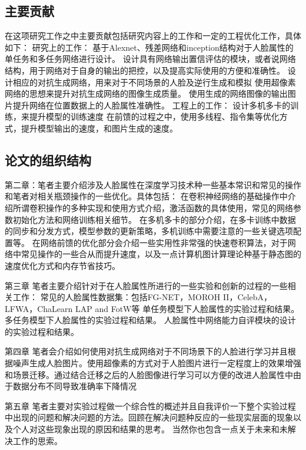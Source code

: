 \subsection{主要贡献}
在这项研究工作之中主要贡献包括研究内容上的工作和一定的工程优化工作，具体如下：
研究上的工作：
基于Alexnet、残差网络和inception结构对于人脸属性的单任务和多任务网络进行设计。
设计具有网络输出置信评估的模块，或者说网络结构，用于网络对于自身的输出的把控，以及提高实际使用的方便和准确性。
设计相应的对抗生成网络，用来对于不同场景的人脸及逆行生成和模拟
使用超像素网络的思想来提升对抗生成网络的图像生成质量。
使用生成的网络图像的输出图片提升网络在位置数据上的人脸属性准确性。
工程上的工作：
设计多机多卡的训练，来提升模型的训练速度
在前馈的过程之中，使用多线程、指令集等优化方式，提升模型输出的速度，和图片生成的速度。

\subsection{论文的组织结构}
第二章：笔者主要介绍涉及人脸属性在深度学习技术种一些基本常识和常见的操作和笔者对相关瓶颈操作的一些优化。具体包括：
在卷积神经网络的基础操作中介绍所谓卷积操作的多种实现和使用方式介绍，激活函数的具体使用，常见的网络参数初始化方法和网络训练相关细节。
在多机多卡的部分介绍，在多卡训练中数据的同步和分发方式，模型参数的更新策略，多机训练中需要注意的一些关键选项配置等。
在网络前馈的优化部分会介绍一些实用性非常强的快速卷积算法，对于网络中常见操作的一些合从而提升速度，以及一点计算机图计算理论种基于静态图的速度优化方式和内存节省技巧。

第三章
笔者主要介绍针对于在人脸属性所进行的一些实验和创新的过程的一些相关工作：
常见的人脸属性数据集：包括FG-NET，MOROH II，CelebA，LFWA，ChaLearn LAP and FotW等
单任务模型下人脸属性的实验过程和结果。
多任务模型下人脸属性的实验过程和结果。
人脸属性中网络能力自评模块的设计的实验过程和结果。

第四章
笔者会介绍如何使用对抗生成网络对于不同场景下的人脸进行学习并且根据噪声生成人脸图片。使用超像素的方式对于人脸图片进行一定程度上的效果增强和场景迁移。通过结合迁移之后的人脸图像进行学习可以方便的改进人脸属性中由于数据分布不同导致准确率下降情况

第五章
笔者主要对实验过程做一个综合性的概述并且自我评价一下整个实验过程中出现的问题和解决问题的方法。回顾在解决问题种反应的一些现实层面的现象以及个人对这些现象出现的原因和结果的思考。
当然你也包含一点关于未来和未解决工作的思索。
